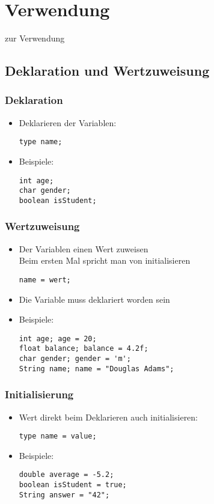 \documentclass[final]{beamer}
\begin{document}
\section{Verwendung}
\begin{frame}
  \begin{center}
    \Huge{zur Verwendung}
  \end{center}
\end{frame}

\subsection{Deklaration und Wertzuweisung}
\begin{frame}[fragile]
  \frametitle{Deklaration}
  \begin{itemize}
  \item Deklarieren der Variablen:
    \begin{lstlisting}[morekeywords={type}]
type name;
    \end{lstlisting}
  \item Beispiele:
    \begin{lstlisting}
int age;
char gender;
boolean isStudent;
    \end{lstlisting}
  \end{itemize}
\end{frame}

\begin{frame}[fragile]
  \frametitle{Wertzuweisung}
  \begin{itemize}
  \item Der Variablen einen Wert zuweisen\\
  Beim ersten Mal spricht man von initialisieren
    \begin{lstlisting}[morekeywords={type}]
name = wert;
    \end{lstlisting}
  \item Die Variable muss deklariert worden sein
  \item Beispiele:
    \begin{lstlisting}[morekeywords={String}]
int age; age = 20;
float balance; balance = 4.2f;
char gender; gender = 'm';
String name; name = "Douglas Adams";
    \end{lstlisting}
  \end{itemize}
\end{frame}

\begin{frame}[fragile]
  \frametitle{Initialisierung}
  \begin{itemize}
  \item Wert direkt beim Deklarieren auch initialisieren:
    \begin{lstlisting}[morekeywords={type}]
type name = value;
    \end{lstlisting}
  \item Beispiele:
    \begin{lstlisting}[morekeywords={String}]
double average = -5.2;
boolean isStudent = true;
String answer = "42";
    \end{lstlisting}
  \end{itemize}
\end{frame}
\end{document}
